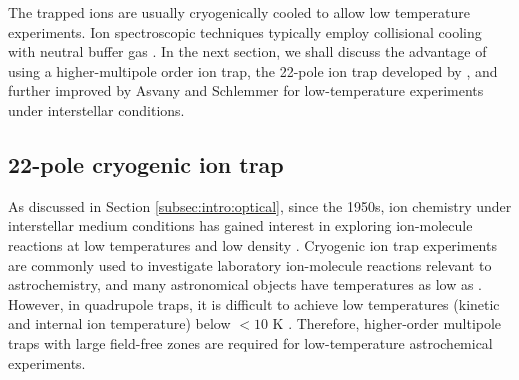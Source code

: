 The trapped ions are usually cryogenically cooled to allow low temperature experiments. Ion spectroscopic techniques typically employ collisional cooling with neutral buffer gas \cite{dehmelt_radiofrequency_1968, wester_radiofrequency_2009}. In the next section, we shall discuss the advantage of using a higher-multipole order ion trap, the 22-pole ion trap developed by \citet{gerlich_ion-neutral_1995}, and further improved by Asvany and Schlemmer \cite{asvany_note_2010} for low-temperature experiments under interstellar conditions.

\subsection{22-pole cryogenic ion trap}
\label{subsec:22-pole}

As discussed in Section \ref{subsec:intro:optical}, since the 1950s, ion chemistry under interstellar medium conditions has gained interest in exploring ion-molecule reactions at low temperatures and low density \cite{smith_ion_1992, gerlich_experimental_1992}. Cryogenic ion trap experiments are commonly used to investigate laboratory ion-molecule reactions relevant to astrochemistry, and many astronomical objects have temperatures as low as  \cite{harju_detection_2008}. However, in quadrupole traps, it is difficult to achieve low temperatures (kinetic and internal ion temperature) below $<10$ K \cite{gerlich_inhomogeneous_1992}. Therefore, higher-order multipole traps with large field-free zones are required for low-temperature astrochemical experiments.\\

